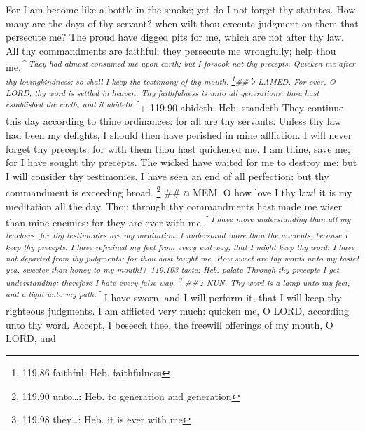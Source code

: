  For I am become like a bottle in the smoke; yet do I not
forget thy statutes.  How many are the days of thy servant?
when wilt thou execute judgment on them that persecute me? 
The proud have digged pits for me, which are not after thy law.
 All thy commandments are faithful: they persecute me
wrongfully; help thou me.\textsuperscript{\emph{\^{}  They
had almost consumed me upon earth; but I forsook not thy precepts.
 Quicken me after thy lovingkindness; so shall I keep the
testimony of thy mouth. \footnote{119.86 faithful: Heb. faithfulness}\#\#
ל LAMED.  For ever, O LORD, thy word is settled in heaven.
 Thy faithfulness is unto all generations: thou hast
established the earth, and it abideth.\^{}}}+ 119.90 abideth: Heb.
standeth  They continue this day according to thine
ordinances: for all are thy servants.  Unless thy law had
been my delights, I should then have perished in mine affliction.
 I will never forget thy precepts: for with them thou hast
quickened me.  I am thine, save me; for I have sought thy
precepts.  The wicked have waited for me to destroy me: but
I will consider thy testimonies.  I have seen an end of all
perfection: but thy commandment is exceeding broad. \footnote{119.90
  unto\ldots: Heb. to generation and generation} \#\# מ MEM.
 O how love I thy law! it is my meditation all the day.
 Thou through thy commandments hast made me wiser than mine
enemies: for they are ever with me.\textsuperscript{\emph{\^{}
 I have more understanding than all my teachers: for thy
testimonies are my meditation.  I understand more than the
ancients, because I keep thy precepts.  I have refrained
my feet from every evil way, that I might keep thy word. 
I have not departed from thy judgments: for thou hast taught me.
 How sweet are thy words unto my taste! yea, sweeter than
honey to my mouth!+ 119.103 taste: Heb. palate  Through
thy precepts I get understanding: therefore I hate every false way.
\footnote{119.98 they\ldots: Heb. it is ever with me} \#\# נ NUN.
 Thy word is a lamp unto my feet, and a light unto my
path.\^{}}}  I have sworn, and I will perform it, that I
will keep thy righteous judgments.  I am afflicted very
much: quicken me, O LORD, according unto thy word. 
Accept, I beseech thee, the freewill offerings of my mouth, O LORD, and
